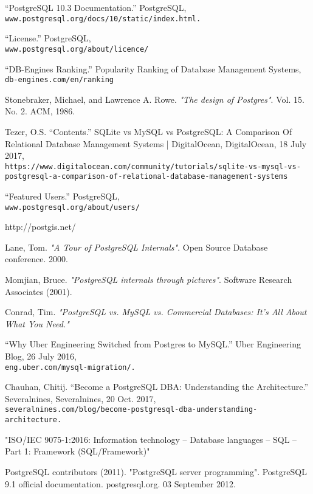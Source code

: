 \documentclass[a4paper]{article}
\begin{document}
\begin{thebibliography}{10}
“PostgreSQL 10.3 Documentation.” PostgreSQL, 
\\\texttt{www.postgresql.org/docs/10/static/index.html.}


“License.” PostgreSQL, 
\\\texttt{www.postgresql.org/about/licence/}

“DB-Engines Ranking.” Popularity Ranking of Database Management Systems,
\\\texttt{db-engines.com/en/ranking}

Stonebraker, Michael, and Lawrence A. Rowe. 
\textit{"The design of Postgres"}. 
Vol. 15. No. 2. ACM, 1986.

Tezer, O.S. “Contents.” SQLite vs MySQL vs PostgreSQL: A Comparison Of Relational Database Management Systems | DigitalOcean, DigitalOcean, 18 July 2017, 
\\\texttt{https://www.digitalocean.com/community/tutorials/sqlite-vs-mysql-vs-postgresql-a-comparison-of-relational-database-management-systems}


“Featured Users.” PostgreSQL, 
\\\texttt{www.postgresql.org/about/users/}

http://postgis.net/

Lane, Tom.
\textit{"A Tour of PostgreSQL Internals"}. 
Open Source Database conference. 2000.

Momjian, Bruce.
\textit{"PostgreSQL internals through pictures"}. 
Software Research Associates (2001).

Conrad, Tim.
\textit{"PostgreSQL vs. MySQL vs. Commercial Databases: It's All About What You Need."}

“Why Uber Engineering Switched from Postgres to MySQL.” Uber Engineering Blog, 26 July 2016, 
\\\texttt{eng.uber.com/mysql-migration/.}

Chauhan, Chitij. “Become a PostgreSQL DBA: Understanding the Architecture.” Severalnines, Severalnines, 20 Oct. 2017, 
\\\texttt{severalnines.com/blog/become-postgresql-dba-understanding-architecture.}


"ISO/IEC 9075-1:2016: Information technology – Database languages – SQL – Part 1: Framework (SQL/Framework)"

PostgreSQL contributors (2011). "PostgreSQL server programming". PostgreSQL 9.1 official documentation. postgresql.org. 03 September 2012.


\end{thebibliography}
\end{document}
